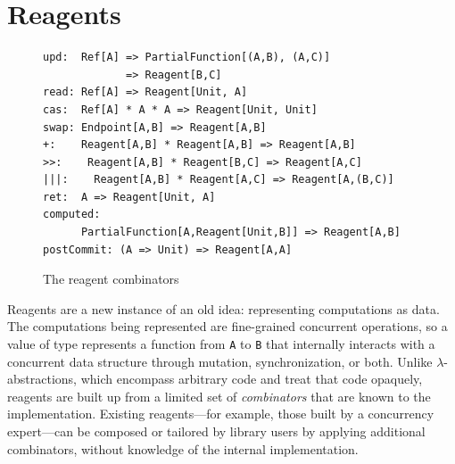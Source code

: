 \documentclass[preprint,nocopyrightspace]{sigplanconf}
\begin{document}

\section{Reagents}
\label{sec:reagents}

\begin{figure}
\begin{lstlisting}[mathescape=true,frame=single]
upd:  Ref[A] => PartialFunction[(A,B), (A,C)] 
             => Reagent[B,C]
read: Ref[A] => Reagent[Unit, A]
cas:  Ref[A] * A * A => Reagent[Unit, Unit]
swap: Endpoint[A,B] => Reagent[A,B]
+:    Reagent[A,B] * Reagent[A,B] => Reagent[A,B]
>>:    Reagent[A,B] * Reagent[B,C] => Reagent[A,C]
|||:    Reagent[A,B] * Reagent[A,C] => Reagent[A,(B,C)]  
ret:  A => Reagent[Unit, A]
computed: 
      PartialFunction[A,Reagent[Unit,B]] => Reagent[A,B]
postCommit: (A => Unit) => Reagent[A,A]
\end{lstlisting}
\nocaptionrule
\caption{The reagent combinators}
\label{fig:combinators}
\end{figure}


Reagents are a new instance of an old idea: representing computations as data.
The computations being represented are fine-grained concurrent operations, so
a value of type  represents a function from \lstinline{A} to
\lstinline{B} that internally interacts with a concurrent data structure
through mutation, synchronization, or both.
Unlike $\lambda$-abstractions, which encompass arbitrary code and treat that
code opaquely, reagents are built up from a limited set of \emph{combinators}
that are known to the implementation.  Existing reagents---for example, those
built by a concurrency expert---can be composed or tailored by library users
by applying additional combinators, without knowledge of the internal
implementation.  
\end{document}
